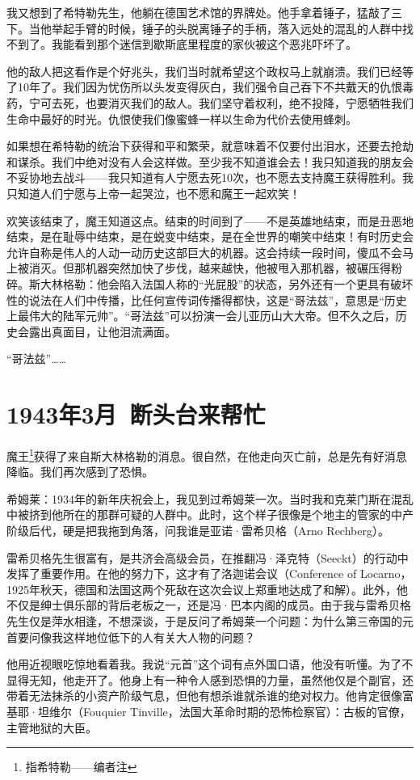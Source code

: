 \documentclass[UTF8]{ctexart}
\begin{document}
我又想到了希特勒先生，他躺在德国艺术馆的界牌处。他手拿着锤子，猛敲了三下。当他举起手臂的时候，锤子的头脱离锤子的手柄，落入远处的混乱的人群中找不到了。我能看到那个迷信到歇斯底里程度的家伙被这个恶兆吓坏了。

他的敌人把这看作是个好兆头，我们当时就希望这个政权马上就崩溃。我们已经等了10年了。我们因为忧伤所以头发变得灰白，我们强令自己吞下不共戴天的仇恨毒药，宁可去死，也要消灭我们的敌人。我们坚守着权利，绝不投降，宁愿牺牲我们生命中最好的时光。仇恨使我们像蜜蜂一样以生命为代价去使用蜂刺。

如果想在希特勒的统治下获得和平和繁荣，就意味着不仅要付出泪水，还要去抢劫和谋杀。我们中绝对没有人会这样做。至少我不知道谁会去！我只知道我的朋友会不妥协地去战斗——我只知道有人宁愿去死10次，也不愿去支持魔王获得胜利。我只知道人们宁愿与上帝一起哭泣，也不愿和魔王一起欢笑！

欢笑该结束了，魔王知道这点。结束的时间到了——不是英雄地结束，而是丑恶地结束，是在耻辱中结束，是在蜕变中结束，是在全世界的嘲笑中结束！有时历史会允许自称是伟人的人动一动历史这部巨大的机器。这会持续一段时间，傻瓜不会马上被消灭。但那机器突然加快了步伐，越来越快，他被甩入那机器，被碾压得粉碎。斯大林格勒：他会陷入法国人称的“光屁股”的状态，另外还有一个更具有破坏性的说法在人们中传播，比任何宣传词传播得都快，这是“哥法兹”，意思是“历史上最伟大的陆军元帅”。“哥法兹”可以扮演一会儿亚历山大大帝。但不久之后，历史会露出真面目，让他泪流满面。

“哥法兹”……

\section{1943年3月\ 断头台来帮忙}

魔王\footnote{指希特勒——编者注}获得了来自斯大林格勒的消息。很自然，在他走向灭亡前，总是先有好消息降临。我们再次感到了恐惧。

希姆莱：1934年的新年庆祝会上，我见到过希姆莱一次。当时我和克莱门斯在混乱中被挤到他所在的那群可疑的人群中。此时，这个样子很像是个地主的管家的中产阶级后代，硬是把我拖到角落，问我谁是亚诺·雷希贝格（Arno Rechberg）。

雷希贝格先生很富有，是共济会高级会员，在推翻冯·泽克特（Seeckt）的行动中发挥了重要作用。在他的努力下，这才有了洛迦诺会议（Conference of Locarno，1925年秋天，德国和法国这两个死敌在这次会议上郑重地达成了和解）。此外，他不仅是绅士俱乐部的背后老板之一，还是冯·巴本内阁的成员。由于我与雷希贝格先生仅是萍水相逢，不想深谈，于是反问了希姆莱一个问题：为什么第三帝国的元首要问像我这样地位低下的人有关大人物的问题？

他用近视眼吃惊地看着我。我说“元首”这个词有点外国口语，他没有听懂。为了不显得无知，他走开了。他身上有一种令人感到恐惧的力量，虽然他仅是个副官，还带着无法抹杀的小资产阶级气息，但他有想杀谁就杀谁的绝对权力。他肯定很像富基耶·坦维尔（Fouquier Tinville，法国大革命时期的恐怖检察官）：古板的官僚，主管地狱的大臣。
\end{document}
